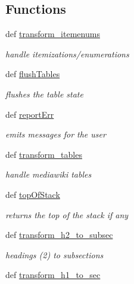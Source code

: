 \subsection*{\-Functions}
\begin{DoxyCompactItemize}
\item 
def \hyperlink{namespaceuicilibris_1_1transform2article_a402316d054f41765e2b6490513750b14}{transform\-\_\-itemenums}
\begin{DoxyCompactList}\small\item\em handle itemizations/enumerations \end{DoxyCompactList}\item 
def \hyperlink{namespaceuicilibris_1_1transform2article_adc9ad30ec8ba4c3939a2a11f1a108d70}{flush\-Tables}
\begin{DoxyCompactList}\small\item\em flushes the table state \end{DoxyCompactList}\item 
def \hyperlink{namespaceuicilibris_1_1transform2article_ab92d095e516d746a0676829967e87d51}{report\-Err}
\begin{DoxyCompactList}\small\item\em emits messages for the user \end{DoxyCompactList}\item 
def \hyperlink{namespaceuicilibris_1_1transform2article_a46ff8620c2ea3a9237dedb1c69f983cb}{transform\-\_\-tables}
\begin{DoxyCompactList}\small\item\em handle mediawiki tables \end{DoxyCompactList}\item 
def \hyperlink{namespaceuicilibris_1_1transform2article_ad8bb9c3b834b3800045201c94ace9a6d}{top\-Of\-Stack}
\begin{DoxyCompactList}\small\item\em returns the top of the stack if any \end{DoxyCompactList}\item 
def \hyperlink{namespaceuicilibris_1_1transform2article_a09b2ace90a3c3e6e657b487a2d1f9cb6}{transform\-\_\-h2\-\_\-to\-\_\-subsec}
\begin{DoxyCompactList}\small\item\em headings (2) to subsections \end{DoxyCompactList}\item 
def \hyperlink{namespaceuicilibris_1_1transform2article_a429ee4364e6acec5f81cfa71b967dfc6}{transform\-\_\-h1\-\_\-to\-\_\-sec}

\end{DoxyCompactItemize}
